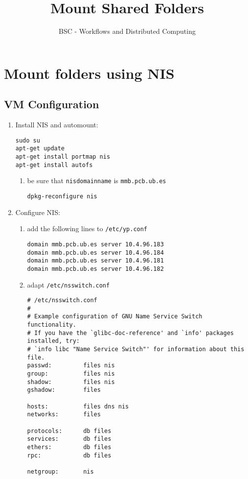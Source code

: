 \documentclass[a4paper,10pt]{article}
\title{Mount Shared Folders}
\author{BSC - Workflows and Distributed Computing}
\begin{document}
\maketitle

\section{Mount folders using NIS}
\subsection{VM Configuration}
\begin{enumerate}

\item Install NIS and automount:
\begin{verbatim}
sudo su
apt-get update
apt-get install portmap nis
apt-get install autofs
\end{verbatim}
\begin{enumerate}
\item be sure that \texttt{nisdomainname} is \texttt{mmb.pcb.ub.es}
\begin{verbatim}
dpkg-reconfigure nis
\end{verbatim}
\end{enumerate}

\item Configure NIS:
\begin{enumerate}
\item add the following lines to \texttt{/etc/yp.conf}
\begin{verbatim}
domain mmb.pcb.ub.es server 10.4.96.183
domain mmb.pcb.ub.es server 10.4.96.184
domain mmb.pcb.ub.es server 10.4.96.181
domain mmb.pcb.ub.es server 10.4.96.182
\end{verbatim}
\item adapt \texttt{/etc/nsswitch.conf}
\begin{verbatim}
# /etc/nsswitch.conf
#
# Example configuration of GNU Name Service Switch functionality.
# If you have the `glibc-doc-reference' and `info' packages installed, try:
# `info libc "Name Service Switch"' for information about this file.
passwd:         files nis
group:          files nis
shadow:         files nis
gshadow:        files

hosts:          files dns nis
networks:       files

protocols:      db files
services:       db files
ethers:         db files
rpc:            db files

netgroup:       nis


\end{verbatim}
\end{enumerate}
\end{enumerate}
\end{document}
